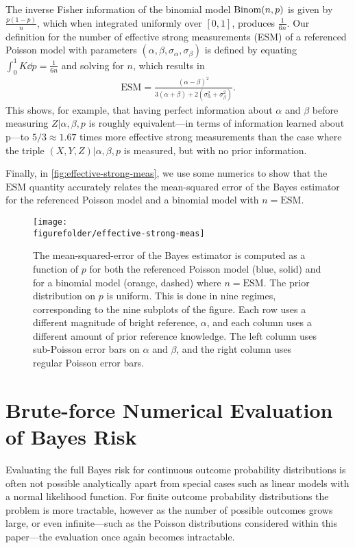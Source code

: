 \documentclass[aps,nofootinbib,twocolumn,superscriptaddress]{revtex4}
\newcommand{\figurefolder}{../fig}
\newcommand{\ESM}{\text{ESM}}
\begin{document}
The inverse Fisher information of the binomial model $\operatorname{Binom}(n,p)$
is given by $\frac{p(1-p)}{n}$, which when integrated uniformly over
$[0,1]$, produces $\frac{1}{6n}$.
Our definition for the number of effective strong measurements (ESM)
of a referenced Poisson model with parameters
$(\alpha,\beta,\sigma_\alpha,\sigma_\beta)$ is defined by
equating $\int_0^1 K\dd p=\frac{1}{6n}$ and solving for $n$,
which results in
\begin{align}
   \ESM = \frac{
            (\alpha-\beta)^2
        }{
            3(\alpha+\beta)+2\left(\sigma_\alpha^2+\sigma_\beta^2\right)
        }.
\end{align}
This shows, for example,
that having perfect information about $\alpha$ and $\beta$
before measuring $Z|\alpha,\beta,p$ is roughly equivalent---in terms
of information learned about p---to
$5/3\approx 1.67$ times more effective strong measurements
than the case where the triple $(X,Y,Z)|\alpha,\beta,p$ is
measured, but with no prior information.

Finally, in \autoref{fig:effective-strong-meas}, we use some numerics
to show that the $\ESM$
quantity accurately relates the mean-squared error of the Bayes estimator
for the referenced Poisson model and a binomial model with $n=\ESM$.

\begin{figure}
    \texttt{[image: \\figurefolder/effective-strong-meas]}
    \caption{The mean-squared-error of the Bayes estimator is computed
    as a function of $p$
    for both the referenced Poisson model (blue, solid) and for a binomial model
    (orange, dashed) where $n=\ESM$.
    The prior distribution on $p$ is uniform.
    This is done in nine regimes, corresponding to the nine subplots of the figure.
    Each row uses a different magnitude of bright reference, $\alpha$,
    and each column uses a different amount of prior reference knowledge.
    The left column uses sub-Poisson error bars on $\alpha$ and $\beta$,
    and the right column uses regular Poisson error bars.}
    \label{fig:effective-strong-meas}
\end{figure}

\section{Brute-force Numerical Evaluation of Bayes Risk}
\label{apx:brute-force-bayes-risk}
Evaluating the full Bayes risk for continuous outcome probability distributions is often not possible analytically apart from special cases such as linear models with a normal likelihood function. For finite outcome probability distributions the problem is more tractable, however as the number of possible outcomes grows large, or even infinite---such as the Poisson distributions considered within this paper---the evaluation once again becomes intractable.
\end{document}
